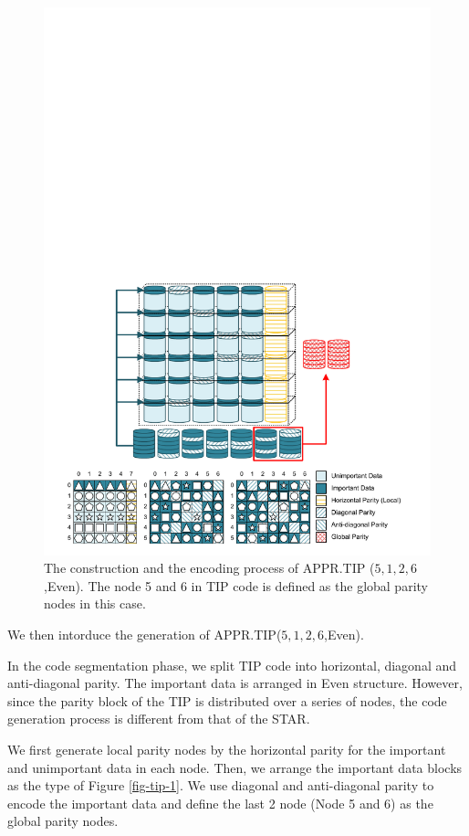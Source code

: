 \documentclass[sigconf]{acmart}
\begin{document}
\begin{figure}[ht]
\centering
\includegraphics[width=\linewidth]{photo/AP-5126-v2.pdf}
\caption{The construction and the encoding process of APPR.TIP ($5,1,2,6$,Even). The node 5 and 6 in TIP code is defined as the global parity nodes in this case.}
\label{fig-ap-TIP}
\end{figure}

We then intorduce the generation of APPR.TIP($5,1,2,6$,Even).

In the code segmentation phase, we split TIP code into horizontal, diagonal and anti-diagonal parity. The important data is arranged in Even structure. However, since the parity block of the TIP is distributed over a series of nodes, the code generation process is different from that of the STAR.

We first generate local parity nodes by the horizontal parity for the important and unimportant data in each node. Then, we arrange the important data blocks as the type of Figure \ref{fig-tip-1}.
We use diagonal and anti-diagonal parity to encode the important data and define the last 2 node (Node 5 and 6) as the global parity nodes.
\end{document}
